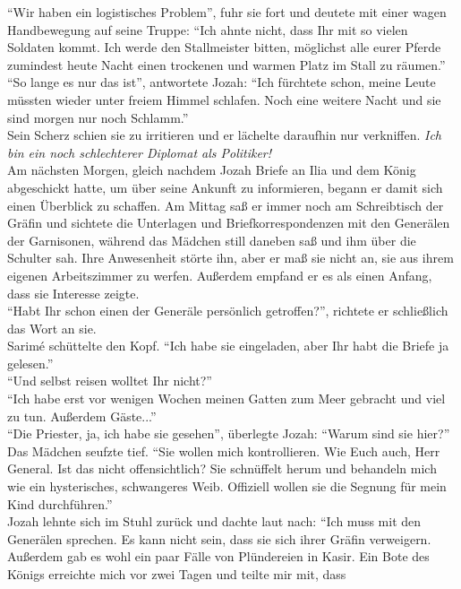 ``Wir haben ein logistisches Problem'', fuhr sie fort und deutete mit einer wagen Handbewegung auf 
seine Truppe: ``Ich ahnte nicht, dass Ihr mit so vielen Soldaten kommt. Ich werde den Stallmeister 
bitten, möglichst alle eurer Pferde zumindest heute Nacht einen trockenen und warmen Platz im Stall 
zu räumen.''\\
``So lange es nur das ist'', antwortete Jozah: ``Ich fürchtete schon, meine Leute müssten wieder 
unter freiem Himmel schlafen. Noch eine weitere Nacht und sie sind morgen nur noch Schlamm.''\\
Sein Scherz schien sie zu irritieren und er lächelte daraufhin nur verkniffen. \textit{Ich bin ein 
noch schlechterer Diplomat als Politiker!}\\

Am nächsten Morgen, gleich nachdem Jozah Briefe an Ilia und dem König abgeschickt hatte, um 
über seine Ankunft zu informieren, begann er damit sich einen Überblick zu schaffen. Am Mittag saß 
er immer noch am Schreibtisch der Gräfin und sichtete die Unterlagen und Briefkorrespondenzen mit 
den Generälen der Garnisonen, während das Mädchen still daneben saß und ihm über die Schulter sah. 
Ihre Anwesenheit störte ihn, aber er maß sie nicht an, sie aus ihrem eigenen Arbeitszimmer zu 
werfen. Außerdem empfand er es als einen Anfang, dass sie Interesse zeigte.\\
``Habt Ihr schon einen der Generäle persönlich getroffen?'', richtete er schließlich das Wort an 
sie.\\
Sarimé schüttelte den Kopf. ``Ich habe sie eingeladen, aber Ihr habt die Briefe ja gelesen.''\\
``Und selbst reisen wolltet Ihr nicht?''\\
``Ich habe erst vor wenigen Wochen meinen Gatten zum Meer gebracht und viel zu tun. Außerdem 
Gäste...''\\
``Die Priester, ja, ich habe sie gesehen'', überlegte Jozah: ``Warum sind sie hier?''\\
Das Mädchen seufzte tief. ``Sie wollen mich kontrollieren. Wie Euch auch, Herr General. Ist das 
nicht offensichtlich? Sie schnüffelt herum und behandeln mich wie ein hysterisches, schwangeres 
Weib. Offiziell wollen sie die Segnung für mein Kind durchführen.''\\
Jozah lehnte sich im Stuhl zurück und dachte laut nach: ``Ich muss mit den Generälen sprechen. Es 
kann nicht sein, dass sie sich ihrer Gräfin verweigern. Außerdem gab es wohl ein paar Fälle von 
Plündereien in Kasir. Ein Bote des Königs erreichte mich vor zwei Tagen und teilte mir mit, dass 
